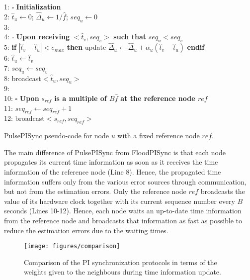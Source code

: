 \documentclass[english,a4paper,10pt,final]{article}
\numberwithin{equation}{section}
\numberwithin{figure}{section}
\begin{document}
\begin{algorithm}

\label{alg:PulsePI}
1: $\square$ \textbf{Initialization} \\
2: $\hat{t}_{u}\leftarrow0$; $\hat{\Delta}_{u}\leftarrow 1/\hat{f}$; $seq_{u}\leftarrow0$  \\
3: \\
4: $\square$ \textbf{Upon receiving} $<\hat{t}_{v},seq_{v}>$ \textbf{such that} $seq_{u}<seq_{v}$ \\
5: \textbf{if} $|\hat{t}_{v} - \hat{t}_{u}| < e_{max}$ \textbf{then} update $\hat{\Delta}_{u}\leftarrow \hat{\Delta}_{u} +  \alpha_u(\hat{t}_{v} - \hat{t}_{u})$ \textbf{endif}\\
6:   $\hat{t}_{u}\leftarrow \hat{t}_{v}$ \\
7:   $seq_{u}\leftarrow seq_{v}$ \\ 
8:	 broadcast$<\hat{t}_{u},seq_{u}>$ \\
9: \\
10: $\square$ \textbf{Upon} $s_{ref}$ \textbf{is a multiple of $B\hat{f}$} \textbf{at the reference node $ref$}\\
11: $seq_{ref}\leftarrow seq_{ref}+1$ \\
12: broadcast$<s_{ref},seq_{ref}>$ 
\caption{PulsePISync pseudo-code for node $u$ with a fixed reference node $ref$.}
\end{algorithm}

The main difference of PulsePISync from FloodPISync is that each node propagates its current time information as soon as it receives the time information of the reference node (Line 8). Hence, the propagated time information suffers only from the various error sources through communication, but not from the estimation errors. Only the reference node $ref$  broadcasts the value of its hardware clock together with its current sequence number every $B$ seconds (Lines 10-12). Hence, each node waits an up-to-date time information from the reference node and broadcasts that information as fast as possible to reduce the estimation errors due to the waiting times.

\begin{figure} 
\center

\texttt{[image: figures/comparison]}

\caption{\label{fig:comparison} Comparison of the PI synchronization protocols in terms of the weights given to the neighbours during time information update.}
\end{figure}
\end{document}
